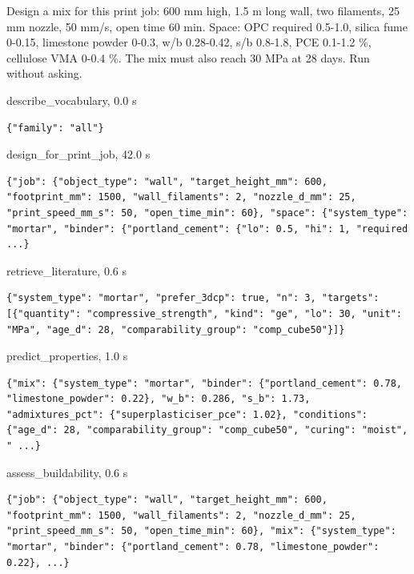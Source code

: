 \begin{userbox}
Design a mix for this print job: 600 mm high, 1.5 m long wall, two filaments, 25 mm nozzle, 50 mm/s, open time 60 min. Space: OPC required 0.5-1.0, silica fume 0-0.15, limestone powder 0-0.3, w/b 0.28-0.42, s/b 0.8-1.8, PCE 0.1-1.2 \%, cellulose VMA 0-0.4 \%. The mix must also reach 30 MPa at 28 days. Run without asking.
\end{userbox}
\begin{toolbox}{describe\_vocabulary, 0.0 s}
\begin{lstlisting}[style=argstyle]
{"family": "all"}
\end{lstlisting}
\end{toolbox}
\begin{toolbox}{design\_for\_print\_job, 42.0 s}
\begin{lstlisting}[style=argstyle]
{"job": {"object_type": "wall", "target_height_mm": 600, "footprint_mm": 1500, "wall_filaments": 2, "nozzle_d_mm": 25, "print_speed_mm_s": 50, "open_time_min": 60}, "space": {"system_type": "mortar", "binder": {"portland_cement": {"lo": 0.5, "hi": 1, "required ...}
\end{lstlisting}
\end{toolbox}
\begin{toolbox}{retrieve\_literature, 0.6 s}
\begin{lstlisting}[style=argstyle]
{"system_type": "mortar", "prefer_3dcp": true, "n": 3, "targets": [{"quantity": "compressive_strength", "kind": "ge", "lo": 30, "unit": "MPa", "age_d": 28, "comparability_group": "comp_cube50"}]}
\end{lstlisting}
\end{toolbox}
\begin{toolbox}{predict\_properties, 1.0 s}
\begin{lstlisting}[style=argstyle]
{"mix": {"system_type": "mortar", "binder": {"portland_cement": 0.78, "limestone_powder": 0.22}, "w_b": 0.286, "s_b": 1.73, "admixtures_pct": {"superplasticiser_pce": 1.02}, "conditions": {"age_d": 28, "comparability_group": "comp_cube50", "curing": "moist", " ...}
\end{lstlisting}
\end{toolbox}
\begin{toolbox}{assess\_buildability, 0.6 s}
\begin{lstlisting}[style=argstyle]
{"job": {"object_type": "wall", "target_height_mm": 600, "footprint_mm": 1500, "wall_filaments": 2, "nozzle_d_mm": 25, "print_speed_mm_s": 50, "open_time_min": 60}, "mix": {"system_type": "mortar", "binder": {"portland_cement": 0.78, "limestone_powder": 0.22}, ...}
\end{lstlisting}
\end{toolbox}
